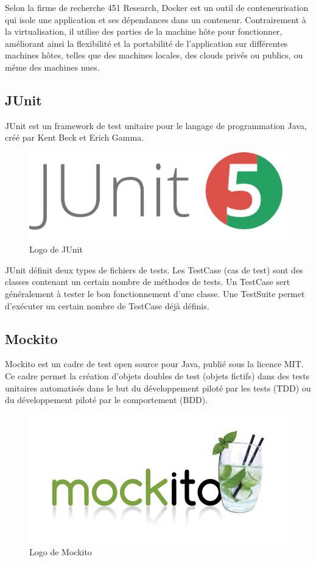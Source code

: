 \noindent Selon la firme de recherche 451 Research, Docker est un outil de conteneurisation qui isole une application et ses dépendances dans un conteneur. Contrairement à la virtualisation, il utilise des parties de la machine hôte pour fonctionner, améliorant ainsi la flexibilité et la portabilité de l'application sur différentes machines hôtes, telles que des machines locales, des clouds privés ou publics, ou même des machines nues.

\clearpage

\subsection{JUnit}

\noindent JUnit est un framework de test unitaire pour le langage de programmation Java, créé par Kent Beck et Erich Gamma.

\begin{figure}[H]
    \centering
    \includegraphics[width=.3\textwidth]{logos/junit.png}
    \caption{Logo de JUnit}
\end{figure}

\noindent JUnit définit deux types de fichiers de tests. Les TestCase (cas de test) sont des classes contenant un certain nombre de méthodes de tests. Un TestCase sert généralement à tester le bon fonctionnement d'une classe. Une TestSuite permet d'exécuter un certain nombre de TestCase déjà définis.


\subsection{Mockito}
\noindent Mockito est un cadre de test open source pour Java, publié sous la licence MIT. Ce cadre permet la création d'objets doubles de test (objets fictifs) dans des tests unitaires automatisés dans le but du développement piloté par les tests (TDD) ou du développement piloté par le comportement (BDD).

\begin{figure}[H]
    \centering
    \includegraphics[width=.4\textwidth]{logos/mockito.png}
    \caption{Logo de Mockito}
\end{figure}

